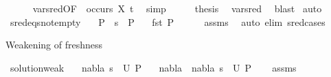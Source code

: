 \begin{isabellebody}
\ \ \ \ \isamarkupfalse%
\ var{\isacharunderscore}{\kern0pt}{}{\isacharunderscore}{\kern0pt}sred{\isacharbrackleft}{\kern0pt}OF\ {\isacartoucheopen}{\isasymnot}\ occurs\ X\ t{}{\isacartoucheclose}{\isacharbrackright}{\kern0pt}\ \isamarkupfalse%
\ simp\isanewline
\ \ \isamarkupfalse%
\ \isamarkupfalse%
\ {\isacharquery}{\kern0pt}thesis\ \isamarkupfalse%
\ var{\isacharunderscore}{\kern0pt}{}{\isacharunderscore}{\kern0pt}sred\ \isamarkupfalse%
\ blast\isanewline
{}\isamarkupfalse%
\ {\isacharparenleft}{\kern0pt}auto{\isacharparenright}{\kern0pt}%
\endisatagproof
{\isafoldproof}%
%
\isadelimproof
\isanewline
%
\endisadelimproof
\isanewline
{}\isamarkupfalse%
\ sred{\isacharunderscore}{\kern0pt}eqs{\isacharunderscore}{\kern0pt}not{\isacharunderscore}{\kern0pt}empty{\isacharcolon}{\kern0pt}\isanewline
\ \ \ {\isachardoublequoteopen}P{}\ {\isasymturnstile}\ s{}\ {\isasymleadsto}\ P{}{\isachardoublequoteclose}\isanewline
\ \ \ {\isachardoublequoteopen}fst\ P{}\ {\isasymnoteq}\ {\isacharbrackleft}{\kern0pt}{\isacharbrackright}{\kern0pt}{\isachardoublequoteclose}\isanewline
%
\isadelimproof
\ \ %
\endisadelimproof
%
\isatagproof
{}\isamarkupfalse%
\ assms\ \isamarkupfalse%
\ {\isacharparenleft}{\kern0pt}auto\ elim{\isacharcolon}{\kern0pt}\ s{\isacharunderscore}{\kern0pt}red{\isachardot}{\kern0pt}cases{\isacharparenright}{\kern0pt}%
\endisatagproof
{\isafoldproof}%
%
\isadelimproof
%
\endisadelimproof
%
\begin{isamarkuptext}%
Weakening of freshness%
\end{isamarkuptext}\isamarkuptrue%
\isamarkupfalse%
\ solution{\isacharunderscore}{\kern0pt}weak{\isacharcolon}{\kern0pt}\isanewline
\ \ \ {\isachardoublequoteopen}{\isacharparenleft}{\kern0pt}nabla{}{\isacharcomma}{\kern0pt}\ s{\isacharparenright}{\kern0pt}\ {\isasymin}\ U\ P{\isachardoublequoteclose}\isanewline
\ \ \ {\isachardoublequoteopen}{\isacharparenleft}{\kern0pt}nabla{}\ {\isasymunion}\ nabla{}{\isacharcomma}{\kern0pt}\ s{\isacharparenright}{\kern0pt}\ {\isasymin}\ U\ P{\isachardoublequoteclose}\isanewline
%
\isadelimproof
\ \ %
\endisadelimproof
%
\isatagproof
{}\isamarkupfalse%
\ assms\isanewline

\end{isabellebody}
